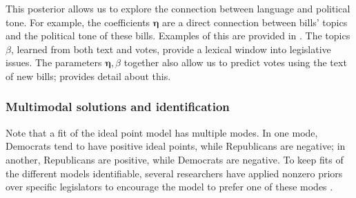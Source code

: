 This posterior allows us to explore the connection between language
and political tone.  For example, the coefficients $\bm \eta$ are a
direct connection between bills' topics and the political tone of
these bills. Examples of this are provided in .
The topics $\beta$, learned from both text and votes, provide a
lexical window into legislative issues.  The parameters $\bm \eta,
\beta$ together also allow us to predict votes using the text of new
bills;  provides detail about this.





\subsubsection*{Multimodal solutions and identification}
Note that a fit of the ideal point model has multiple modes.  In one
mode, Democrats tend to have positive ideal points, while Republicans
are negative; in another, Republicans are positive, while Democrats
are negative.  To keep fits of the different models identifiable,
several researchers have applied nonzero priors over specific
legislators to encourage the model to prefer one of these modes
\citep{jackman:2001,clinton:2004,martin:2002}.

